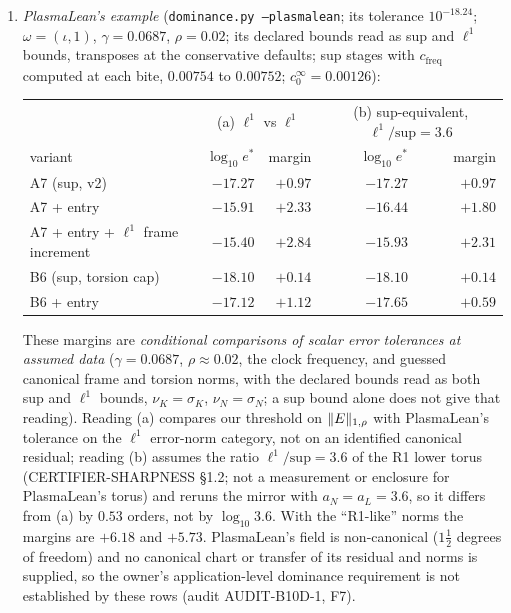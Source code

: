 \begin{remark}[Register]\label{bp:p2s2l1:register}
\begin{enumerate}[label=(\roman*)]
\item \emph{PlasmaLean's example} (\texttt{dominance.py --plasmalean}; its tolerance $10^{-18.24}$; $\omega=(\iota,1)$, $\gamma=0.0687$, $\rho=0.02$; its declared
  bounds read as sup and $\ell^1$ bounds, transposes at the conservative defaults; sup stages with $c_{\mathrm{freq}}$ computed at each bite,
  $0.00754$ to $0.00752$; $c^\infty_0=0.00126$):
  \begin{center}\small
  \begin{tabular}{lrrrr}
  & \multicolumn{2}{c}{(a) $\ell^1$ vs $\ell^1$} & \multicolumn{2}{c}{(b) sup-equivalent, $\ell^1/\text{sup}=3.6$}\\
  variant & $\log_{10}e^*$ & margin & $\log_{10}e^*$ & margin\\\hline
  A7 (sup, v2) & $-17.27$ & $+0.97$ & $-17.27$ & $+0.97$\\
  A7 + entry & $-15.91$ & $+2.33$ & $-16.44$ & $+1.80$\\
  A7 + entry + $\ell^1$ frame increment & $\mathbf{-15.40}$ & $\mathbf{+2.84}$ & $\mathbf{-15.93}$ & $\mathbf{+2.31}$\\
  B6 (sup, torsion cap) & $-18.10$ & $+0.14$ & $-18.10$ & $+0.14$\\
  B6 + entry & $-17.12$ & $+1.12$ & $-17.65$ & $+0.59$
  \end{tabular}
  \end{center}
  These margins are \emph{conditional comparisons of scalar error tolerances at assumed data} ($\gamma=0.0687$, $\rho\approx0.02$, the clock
  frequency, and guessed canonical frame and torsion norms, with the declared bounds read as both sup and $\ell^1$ bounds, $\nu_K=\sigma_K$,
  $\nu_N=\sigma_N$; a sup bound alone does not give that reading). Reading (a) compares our threshold on $\lVert E\rVert_{1,\rho}$ with PlasmaLean's
  tolerance on the $\ell^1$ error-norm category, not on an identified canonical residual; reading (b) assumes the ratio $\ell^1/\text{sup}=3.6$ of
  the R1 lower torus (CERTIFIER-SHARPNESS \S1.2; not a measurement or enclosure for PlasmaLean's torus) and reruns the mirror with $a_N=a_L=3.6$, so
  it differs from (a) by $0.53$ orders, not by $\log_{10}3.6$. With the ``R1-like'' norms the margins are $+6.18$ and $+5.73$. PlasmaLean's field is
  non-canonical ($1\frac12$ degrees of freedom) and no canonical chart or transfer of its residual and norms is supplied, so the owner's
  application-level dominance requirement is not established by these rows (audit AUDIT-B10D-1, F7).

\end{enumerate}
\end{remark}
